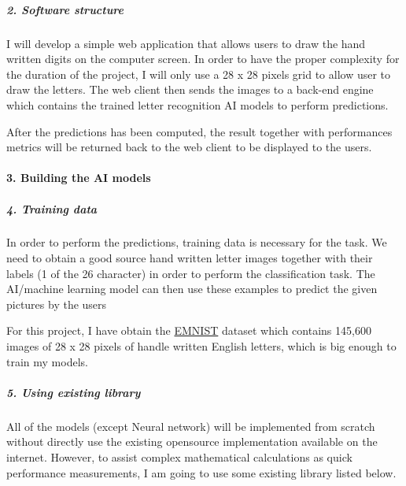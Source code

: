 \documentclass[12pt,english,]{article}
\let\oldparagraph\paragraph
\renewcommand{\paragraph}[1]{\oldparagraph{#1}\mbox{}}
\let\oldsubparagraph\subparagraph
\renewcommand{\subparagraph}[1]{\oldsubparagraph{#1}\mbox{}}
\begin{document}
\hypertarget{software-structure}{%
\subparagraph{2. Software structure}\label{software-structure}}

I will develop a simple web application that allows users to draw the
hand written digits on the computer screen. In order to have the proper
complexity for the duration of the project, I will only use a 28 x 28
pixels grid to allow user to draw the letters. The web client then sends
the images to a back-end engine which contains the trained letter
recognition AI models to perform predictions.

After the predictions has been computed, the result together with
performances metrics will be returned back to the web client to be
displayed to the users.

\hypertarget{building-the-ai-models}{%
\paragraph{3. Building the AI models}\label{building-the-ai-models}}

\hypertarget{training-data}{%
\subparagraph{4. Training data}\label{training-data}}

In order to perform the predictions, training data is necessary for the
task. We need to obtain a good source hand written letter images
together with their labels (1 of the 26 character) in order to perform
the classification task. The AI/machine learning model can then use
these examples to predict the given pictures by the users

For this project, I have obtain the
\href{https://www.nist.gov/itl/products-and-services/emnist-dataset}{EMNIST}
dataset which contains 145,600 images of 28 x 28 pixels of handle
written English letters, which is big enough to train my models.

\hypertarget{using-existing-library}{%
\subparagraph{5. Using existing library}\label{using-existing-library}}

All of the models (except Neural network) will be implemented from
scratch without directly use the existing opensource implementation
available on the internet. However, to assist complex mathematical
calculations as quick performance measurements, I am going to use some
existing library listed below.
\end{document}
